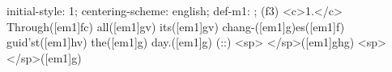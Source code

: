 initial-style: 1;
centering-scheme: english;
def-m1: \grealign;
(f3) <c>1.</c> Through([em1]fc) all([em1]gv) its([em1]gv) chang-([em1]g)es([em1]f) guid'st([em1]hv) the([em1]g) day.([em1]g) (::) <sp> </sp>([em1]ghg) <sp>   </sp>([em1]g)